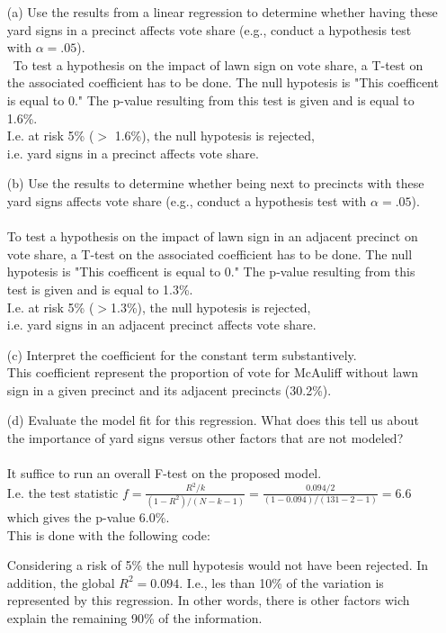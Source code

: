 \documentclass[12pt,letterpaper]{article}
\begin{document}
\vspace{.5cm}
\begin{enumerate}
	\item [(a)] Use the results from a linear regression to determine whether having these yard signs in a precinct affects vote share (e.g., conduct a hypothesis test with $\alpha = .05$).\\
	\
	To test a hypothesis on the impact of lawn sign on vote share, a T-test on the associated coefficient has to be done. The null hypotesis is "This coefficent is equal to 0."
	 The p-value resulting from this test is given and is equal to 1.6\%. \\
	I.e. at risk 5\% ($>$ 1.6\%), the null hypotesis is rejected,\\
	i.e.   yard signs in a precinct affects vote share.
	
		
	\item [(b)]  Use the results to determine whether being
	next to precincts with these yard signs affects vote
	share (e.g., conduct a hypothesis test with $\alpha = .05$).\\
	\\
	To test a hypothesis on the impact of lawn sign in an adjacent precinct on vote share, a T-test on the associated coefficient has to be done. The null hypotesis is "This coefficent is equal to 0."
	 The p-value resulting from this test is given and is equal to 1.3\%. \\
	I.e. at risk 5\% ($>$1.3\%), the null hypotesis is rejected,\\
	i.e.   yard signs in an adjacent precinct affects vote share.
	
	\item [(c)] Interpret the coefficient for the constant term substantively.\\
	This coefficient represent the proportion of vote for McAuliff without lawn sign in a given precinct and its adjacent precincts (30.2\%).
	
	\item [(d)] Evaluate the model fit for this regression.  What does this tell us about the importance of yard signs versus other factors that are not modeled?\\
	\\ 
	It suffice to run an overall F-test on the proposed model. \\
	I.e. the test statistic $f=\frac{R^2/k}{(1-R^2)/(N-k-1)}=\frac{0.094/2}{(1-0.094)/(131-2-1)}=6.6$\\
	which gives the p-value 6.0\%.\\
	This is done with the following code:
	  
	Considering a risk of 5\% the null hypotesis would not have been rejected.  In addition, the global $R^2=0.094$. I.e., les than 10\% of the variation is represented by this
	regression. In other words, there is other factors wich explain the remaining 90\% of the information.\\
	
	
\end{enumerate}  
\end{document}
